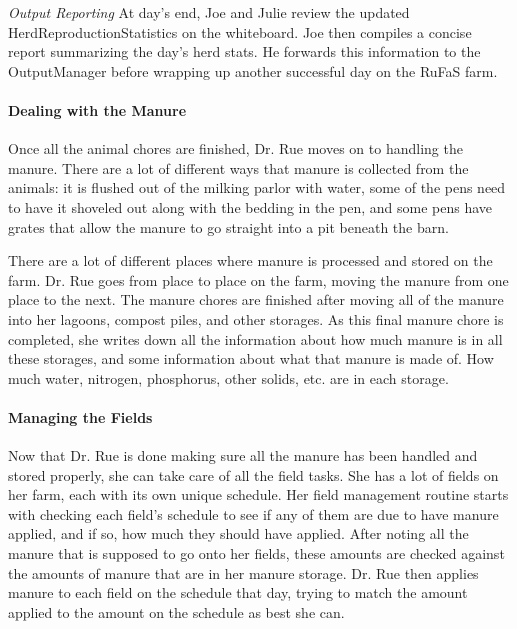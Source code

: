 \documentclass{article}
\begin{document}
\textit{Output Reporting}
At day’s end, Joe and Julie review the updated HerdReproductionStatistics on the whiteboard. Joe then compiles a concise report summarizing the day’s herd stats. He forwards this information to the OutputManager before wrapping up another successful day on the RuFaS farm.
\vspace{0.5cm}

\paragraph{Dealing with the Manure}
Once all the animal chores are finished, Dr. Rue moves on to handling the manure. There are a lot of different ways that manure is collected from the animals: it is flushed out of the milking parlor with water, some of the pens need to have it shoveled out along with the bedding in the pen, and some pens have grates that allow the manure to go straight into a pit beneath the barn.
\vspace{0.2cm}

There are a lot of different places where manure is processed and stored on the farm. Dr. Rue goes from place to place on the farm, moving the manure from one place to the next. The manure chores are finished after moving all of the manure into her lagoons, compost piles, and other storages. As this final manure chore is completed, she writes down all the information about how much manure is in all these storages, and some information about what that manure is made of. How much water, nitrogen, phosphorus, other solids, etc. are in each storage.

\paragraph{Managing the Fields}
Now that Dr. Rue is done making sure all the manure has been handled and stored properly, she can take care of all the field tasks. She has a lot of fields on her farm, each with its own unique schedule. Her field management routine starts with checking each field’s schedule to see if any of them are due to have manure applied, and if so, how much they should have applied. After noting all the manure that is supposed to go onto her fields, these amounts are checked against the amounts of manure that are in her manure storage. Dr. Rue then applies manure to each field on the schedule that day, trying to match the amount applied to the amount on the schedule as best she can.
\vspace{0.2cm}
\end{document}
